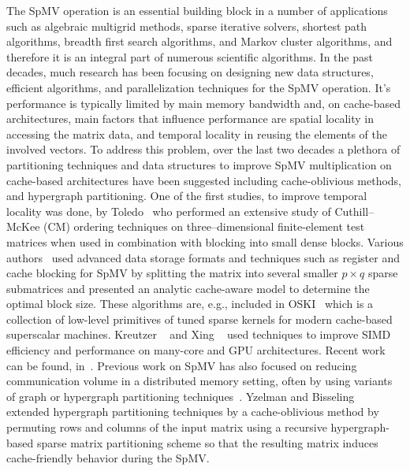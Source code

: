 The \Acrshort{SpMV} operation is an essential building block 
in a number of applications such as algebraic multigrid methods, 
sparse iterative solvers, shortest path algorithms, breadth first search algorithms, 
and Markov cluster algorithms, and therefore it is an integral part 
of numerous scientific algorithms.
In the past decades, much research has been
focusing on designing new data structures, efficient algorithms, and
parallelization  techniques for the \acrshort{SpMV} operation. It's performance is typically limited by main memory bandwidth and, on
cache-based architectures, main factors that influence performance
are spatial locality in accessing the matrix data, and temporal locality in
reusing the elements of the involved vectors. To address this problem, over the
last two decades a plethora of  partitioning techniques
and data structures to improve \acrshort{SpMV} multiplication on cache-based
architectures have been suggested including %
cache-oblivious methods, and hypergraph partitioning. One
of the first studies, \eg to improve temporal locality was done, \eg
by Toledo~\cite{Toledo:1997:IMP:279511.279532} who performed an
extensive study of Cuthill--McKee (CM) ordering
techniques on three--dimensional finite-element test matrices when
used in combination with blocking into small dense blocks. Various
authors~\cite{Williams:2009:OSM:1513001.1513318,doi:10.1177/1094342004041296}
used advanced data storage formats and techniques such as register and cache blocking  for  
\acrshort{SpMV} by splitting the matrix into several smaller $p \times
q$ sparse submatrices and presented an analytic cache-aware model to
determine the optimal block size. These algorithms are, e.g.,
included in OSKI~\cite{1742-6596-16-1-071} which is a collection of
low-level primitives of tuned sparse kernels for modern cache-based
superscalar machines. Kreutzer \etal~\cite{Moritz_sell} and 
Xing \etal~\cite{Liu:2013:ESM:2464996.2465013} used techniques to 
improve SIMD efficiency and performance on many-core and GPU architectures. 
Recent work can be found, \eg
in~\cite{li2017hbm,Liu:2015:CES:2751205.2751209,liu2015spmv}.
 Previous work on  \acrshort{SpMV}  has also focused on reducing
 communication volume in a distributed memory setting, often by using
 variants of graph or hypergraph partitioning
 techniques~\cite{Catalyurek:1999}. Yzelman and
 Bisseling~\cite{doi:10.1137/080733243,Yzelman-thesis-2011} extended
 hypergraph partitioning techniques by a cache-oblivious method by
 permuting rows and columns of the input matrix using a recursive
 hypergraph-based sparse matrix partitioning scheme so that the
 resulting matrix induces cache-friendly behavior during the
 \acrshort{SpMV}.

